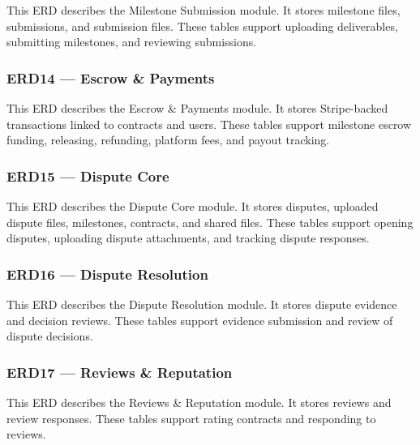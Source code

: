 This ERD describes the Milestone Submission module. It stores milestone files, submissions, and submission files. These tables support uploading deliverables, submitting milestones, and reviewing submissions.


\subsubsection{ERD14 --- Escrow \& Payments}

This ERD describes the Escrow \& Payments module. It stores Stripe-backed transactions linked to contracts and users. These tables support milestone escrow funding, releasing, refunding, platform fees, and payout tracking.


\subsubsection{ERD15 --- Dispute Core}

This ERD describes the Dispute Core module. It stores disputes, uploaded dispute files, milestones, contracts, and shared files. These tables support opening disputes, uploading dispute attachments, and tracking dispute responses.


\subsubsection{ERD16 --- Dispute Resolution}

This ERD describes the Dispute Resolution module. It stores dispute evidence and decision reviews. These tables support evidence submission and review of dispute decisions.


\subsubsection{ERD17 --- Reviews \& Reputation}

This ERD describes the Reviews \& Reputation module. It stores reviews and review responses. These tables support rating contracts and responding to reviews.

